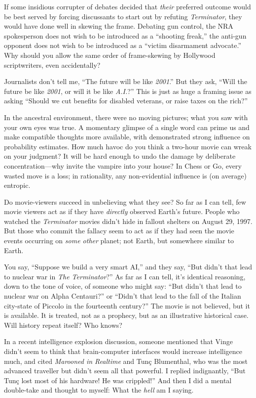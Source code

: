 {
 If some insidious corrupter of debates decided that \textit{their}
preferred outcome would be best served by forcing discussants to start
out by refuting \textit{Terminator}, they would have done well in
skewing the frame. Debating gun control, the NRA spokesperson does not
wish to be introduced as a ``shooting
freak,'' the anti-gun opponent does not wish to be
introduced as a ``victim disarmament
advocate.'' Why should you allow the same order of
frame-skewing by Hollywood scriptwriters, even accidentally?}

{
 Journalists don't tell me, ``The
future will be like \textit{2001}.'' But they ask,
``Will the future be like \textit{2001}, or will it be
like \textit{A.I.}?'' This is just as huge a framing
issue as asking ``Should we cut benefits for disabled
veterans, or raise taxes on the rich?''}

{
 In the ancestral environment, there were no moving pictures; what
you saw with your own eyes was true. A momentary glimpse of a single
word can prime us and make compatible thoughts more available, with
demonstrated strong influence on probability estimates. How much havoc
do you think a two-hour movie can wreak on your judgment? It will be
hard enough to undo the damage by deliberate concentration---why invite
the vampire into your house? In Chess or Go, every wasted move is a
loss; in rationality, any non-evidential influence is (on average)
entropic.}

{
 Do movie-viewers succeed in unbelieving what they see? So far as I
can tell, few movie viewers act as if they have \textit{directly}
observed Earth's future. People who watched the
\textit{Terminator} movies didn't hide in fallout
shelters on August 29, 1997. But those who commit the fallacy seem to
act as if they had seen the movie events occurring on \textit{some
other} planet; not Earth, but somewhere similar to Earth.}

{
 You say, ``Suppose we build a very smart
AI,'' and they say, ``But
didn't that lead to nuclear war in \textit{The
Terminator}?'' As far as I can tell,
it's identical reasoning, down to the tone of voice, of
someone who might say: ``But didn't
that lead to nuclear war on Alpha Centauri?'' or
``Didn't that lead to the fall of the
Italian city-state of Piccolo in the fourteenth
century?'' The movie is not believed, but it is
available. It is treated, not as a prophecy, but as an illustrative
historical case. Will history repeat itself? Who knows?}

{
 In a recent intelligence explosion discussion, someone mentioned
that Vinge didn't seem to think that brain-computer
interfaces would increase intelligence much, and cited \textit{Marooned
in Realtime} and Tunç Blumenthal, who was the most advanced traveller
but didn't seem all that powerful. I replied
indignantly, ``But Tunç lost most of his hardware! He
was crippled!'' And then I did a mental double-take
and thought to myself: What the \textit{hell} am I saying.}

